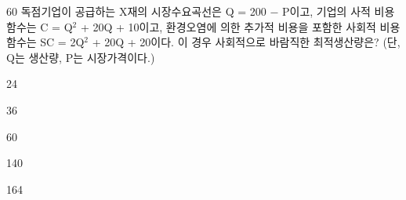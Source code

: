 \begin{question}{60}
독점기업이 공급하는 X재의 시장수요곡선은 Q = 200 $-$ P이고, 기업의 사적 비용함수는 C = Q$^2$ + 20Q + 10이고, 환경오염에 의한 추가적 비용을 포함한 사회적 비용함수는 SC = 2Q$^2$ + 20Q + 20이다. 이 경우 사회적으로 바람직한 최적생산량은? (단, Q는 생산량, P는 시장가격이다.)
\begin{choices}
  \item 24
  \item 36
  \item 60
  \item 140
  \item 164
\end{choices}
\end{question}

